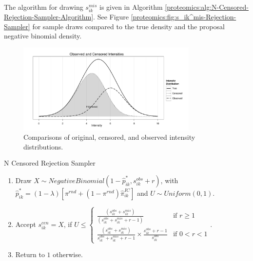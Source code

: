 The algorithm for drawing $s_{ik}^{mis}$ is given in Algorithm \ref{proteomics:alg:N-Censored-Rejection-Sampler-Algorithm}.
See Figure \ref{proteomics:fig:s_ik^mis-Rejection-Sampler} for sample draws compared
to the true density and the proposal negative binomial density.

\begin{figure}[http]
\centering
\includegraphics[width=0.8\textwidth]{figures/proteomics/Fig2_Observed_Censored_Intensity_Distributions}
\caption{Comparisons of original, censored, and observed intensity distributions. \label{proteomics:fig:Laplace_Halleys_Outline}}
\end{figure}

\begin{algorithm}[H]
\caption{N Censored Rejection Sampler\label{proteomics:alg:N-Censored-Rejection-Sampler-Algorithm}}

\begin{enumerate}
\item Draw $X\sim NegativeBinomial(1-\hat{p}_{ik}^{*},s_{ik}^{obs}+r)$, with $\hat{p}_{ik}^{*}=(1-\lambda)\left[\pi^{rnd}+(1-\pi^{rnd})\hat{\pi}_{ik}^{IC}\right]$
and $U\sim Uniform(0,1)$.
\item Accept $s_{ik}^{cen}=X$, if $U\leq\begin{cases}
\frac{(s_{ik}^{obs}+s_{ik}^{mis})}{(s_{ik}^{obs}+s_{ik}^{mis}+r-1)} & \text{if }r\geq1\\
\frac{(s_{ik}^{obs}+s_{ik}^{mis})}{s_{ik}^{obs}+s_{ik}^{mis}+r-1}\times\frac{s_{ik}^{obs}+r-1}{s_{ik}^{obs}} & \text{if }0<r<1
\end{cases}$.
\item Return to $1$ otherwise.\end{enumerate}
\end{algorithm}



